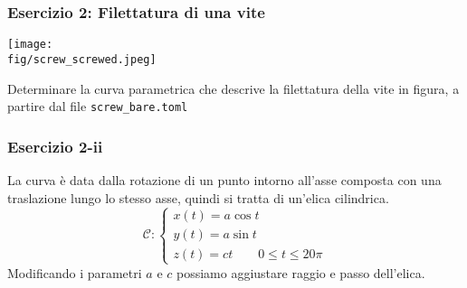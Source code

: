 \documentclass{beamer}
\newcommand{\fig}{figures} %
\begin{document}
\begin{frame}
\frametitle{Esercizio 2: Filettatura di una vite}

\texttt{[image: \\fig/screw\_screwed.jpeg]}

Determinare la curva parametrica che descrive la filettatura della vite in figura, a partire dal file \texttt{screw\_bare.toml}
\end{frame}
\begin{frame}
\frametitle{Esercizio 2-ii}
La curva \`e data dalla rotazione di un punto intorno all'asse composta con una traslazione lungo lo stesso asse, quindi si tratta di un'elica cilindrica.
\begin{displaymath}
\mathcal{C}:\begin{cases}
 x(t)= a\cos t\\
 y(t)=a \sin t\\
  z(t)= ct\qquad  0\leq t\leq 20\pi
\end{cases}
\end{displaymath}
Modificando i parametri $a$ e $c$ possiamo aggiustare raggio e passo dell'elica.
\end{frame}
\end{document}
